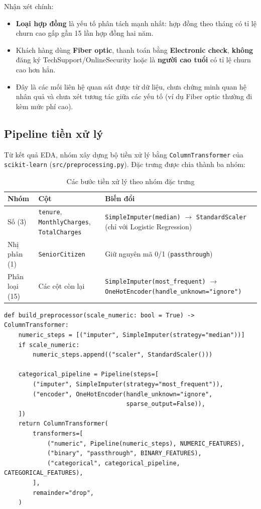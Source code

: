 Nhận xét chính:
\begin{itemize}
    \item \textbf{Loại hợp đồng} là yếu tố phân tách mạnh nhất: hợp đồng theo tháng có tỉ lệ churn cao gấp gần 15 lần hợp đồng hai năm.
    \item Khách hàng dùng \textbf{Fiber optic}, thanh toán bằng \textbf{Electronic check}, \textbf{không} đăng ký TechSupport/OnlineSecurity hoặc là \textbf{người cao tuổi} có tỉ lệ churn cao hơn hẳn.
    \item Đây là các mối liên hệ quan sát được từ dữ liệu, chưa chứng minh quan hệ nhân quả và chưa xét tương tác giữa các yếu tố (ví dụ Fiber optic thường đi kèm mức phí cao).
\end{itemize}

\subsection{Pipeline tiền xử lý}
Từ kết quả EDA, nhóm xây dựng bộ tiền xử lý bằng \texttt{ColumnTransformer} của \texttt{scikit-learn} (\texttt{src/preprocessing.py}). Đặc trưng được chia thành ba nhóm:

\begin{table}[H]
\centering
\begin{tabular}{p{3.2cm} p{5.5cm} p{6.5cm}}
\toprule
\textbf{Nhóm} & \textbf{Cột} & \textbf{Biến đổi} \\
\midrule
Số (3) & \texttt{tenure}, \texttt{MonthlyCharges}, \texttt{TotalCharges} & \texttt{SimpleImputer(median)} $\rightarrow$ \texttt{StandardScaler} (chỉ với Logistic Regression) \\
Nhị phân (1) & \texttt{SeniorCitizen} & Giữ nguyên mã 0/1 (\texttt{passthrough}) \\
Phân loại (15) & Các cột còn lại & \texttt{SimpleImputer(most\_frequent)} $\rightarrow$ \texttt{OneHotEncoder(handle\_unknown="ignore")} \\
\bottomrule
\end{tabular}
\caption{Các bước tiền xử lý theo nhóm đặc trưng}
\end{table}

\begin{lstlisting}[style=pythonstyle, caption={Hàm xây dựng bộ tiền xử lý trong \texttt{src/preprocessing.py}}]
def build_preprocessor(scale_numeric: bool = True) -> ColumnTransformer:
    numeric_steps = [("imputer", SimpleImputer(strategy="median"))]
    if scale_numeric:
        numeric_steps.append(("scaler", StandardScaler()))

    categorical_pipeline = Pipeline(steps=[
        ("imputer", SimpleImputer(strategy="most_frequent")),
        ("encoder", OneHotEncoder(handle_unknown="ignore",
                                  sparse_output=False)),
    ])
    return ColumnTransformer(
        transformers=[
            ("numeric", Pipeline(numeric_steps), NUMERIC_FEATURES),
            ("binary", "passthrough", BINARY_FEATURES),
            ("categorical", categorical_pipeline, CATEGORICAL_FEATURES),
        ],
        remainder="drop",
    )
\end{lstlisting}

